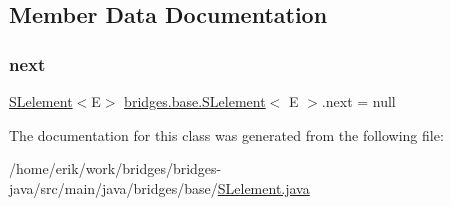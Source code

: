 \subsection{Member Data Documentation}
\mbox{\label{classbridges_1_1base_1_1_s_lelement_abf61c96a74ad319d561c6952ea388e0e}} 
\subsubsection{\texorpdfstring{next}{next}}
{\footnotesize\ttfamily \hyperlink{classbridges_1_1base_1_1_s_lelement}{S\+Lelement}$<$E$>$ \hyperlink{classbridges_1_1base_1_1_s_lelement}{bridges.\+base.\+S\+Lelement}$<$ E $>$.next = null\hspace{0.3cm}{\ttfamily [protected]}}



The documentation for this class was generated from the following file\+:\begin{DoxyCompactItemize}
\item 
/home/erik/work/bridges/bridges-\/java/src/main/java/bridges/base/\hyperlink{_s_lelement_8java}{S\+Lelement.\+java}\end{DoxyCompactItemize}
